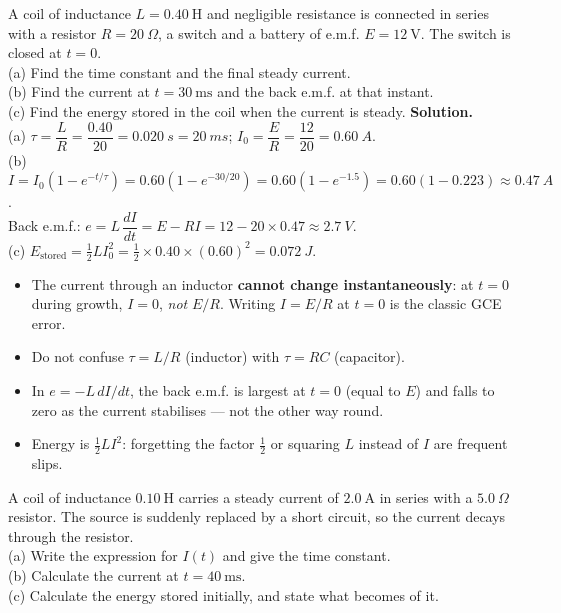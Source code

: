 \documentclass[11pt]{article}
\begin{document}
\begin{exoresolu}
A coil of inductance $L = 0.40\ \mathrm{H}$ and negligible resistance is connected in series with a resistor $R = 20\ \Omega$, a switch and a battery of e.m.f. $E = 12\ \mathrm{V}$. The switch is closed at $t = 0$.\\
(a) Find the time constant and the final steady current.\\
(b) Find the current at $t = 30\ \mathrm{ms}$ and the back e.m.f. at that instant.\\
(c) Find the energy stored in the coil when the current is steady.
\tcblower
\textbf{Solution.}\\
(a) $\tau = \dfrac{L}{R} = \dfrac{0.40}{20} = \SI{0.020}{s} = \SI{20}{ms}$;\qquad
$I_0 = \dfrac{E}{R} = \dfrac{12}{20} = \SI{0.60}{A}$.\\[4pt]
(b) $I = I_0\left(1 - e^{-t/\tau}\right) = 0.60\left(1 - e^{-30/20}\right) = 0.60(1 - e^{-1.5}) = 0.60(1 - 0.223) \approx \SI{0.47}{A}$.\\
Back e.m.f.: $e = L\,\dfrac{dI}{dt} = E - RI = 12 - 20 \times 0.47 \approx \SI{2.7}{V}$.\\[4pt]
(c) $E_{\text{stored}} = \tfrac{1}{2}LI_0^2 = \tfrac{1}{2} \times 0.40 \times (0.60)^2 = \SI{0.072}{J}$.
\end{exoresolu}

\begin{attention}
\begin{itemize}
\item The current through an inductor \textbf{cannot change instantaneously}: at $t = 0$ during growth, $I = 0$, \emph{not} $E/R$. Writing $I = E/R$ at $t = 0$ is the classic GCE error.
\item Do not confuse $\tau = L/R$ (inductor) with $\tau = RC$ (capacitor).
\item In $e = -L\,dI/dt$, the back e.m.f. is largest at $t = 0$ (equal to $E$) and falls to zero as the current stabilises — not the other way round.
\item Energy is $\tfrac{1}{2}LI^2$: forgetting the factor $\tfrac{1}{2}$ or squaring $L$ instead of $I$ are frequent slips.
\end{itemize}
\end{attention}

\begin{exercice}
A coil of inductance $0.10\ \mathrm{H}$ carries a steady current of $2.0\ \mathrm{A}$ in series with a $5.0\ \Omega$ resistor. The source is suddenly replaced by a short circuit, so the current decays through the resistor.\\
(a) Write the expression for $I(t)$ and give the time constant.\\
(b) Calculate the current at $t = 40\ \mathrm{ms}$.\\
(c) Calculate the energy stored initially, and state what becomes of it.
\end{exercice}
\end{document}
